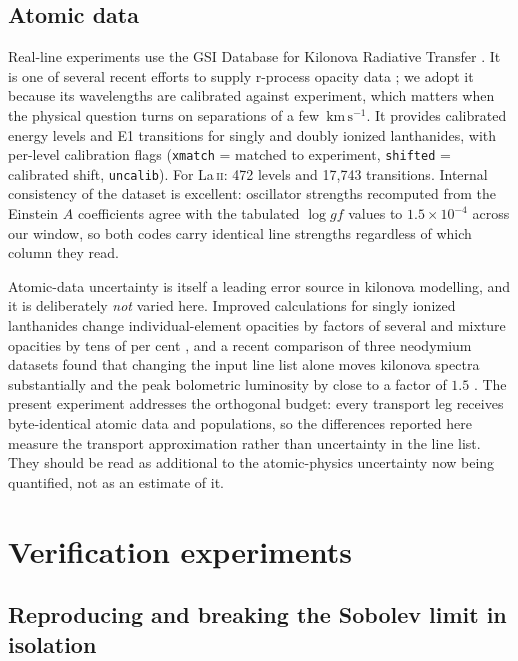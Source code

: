 \documentclass[fleqn,usenatbib]{mnras}
\newcommand{\kms}{\,\mathrm{km\,s^{-1}}}
\begin{document}
\subsection{Atomic data}
\label{sec:data}

Real-line experiments use the GSI Database for Kilonova Radiative Transfer
\citep{gsi_atomic,gsi_zenodo}. It is one of several recent efforts to supply
r-process opacity data \citep[cf.][]{tanaka2020,kato2024}; we adopt it
because its wavelengths are calibrated against experiment, which matters when
the physical question turns on separations of a few $\kms$. It provides
calibrated energy levels and E1 transitions
for singly and doubly ionized lanthanides, with per-level calibration flags
(\texttt{xmatch} = matched to experiment, \texttt{shifted} = calibrated
shift, \texttt{uncalib}). For La\,\textsc{ii}: 472 levels and 17{,}743
transitions. Internal consistency of the dataset is excellent: oscillator
strengths recomputed from the Einstein $A$ coefficients agree with the
tabulated $\log gf$ values to $1.5\times10^{-4}$ across our window, so both
codes carry identical line strengths regardless of which column they read.

Atomic-data uncertainty is itself a leading error source in kilonova
modelling, and it is deliberately \emph{not} varied here. Improved
calculations for singly ionized lanthanides change individual-element
opacities by factors of several and mixture opacities by tens of per cent
\citep{kato2024}, and a recent comparison of three neodymium datasets found
that changing the input line list alone moves kilonova spectra substantially
and the peak bolometric luminosity by close to a factor of $1.5$
\citep{fontes2026}. The present experiment addresses the orthogonal budget:
every transport leg receives byte-identical atomic data and populations, so
the differences reported here measure the transport approximation rather
than uncertainty in the line list. They should be read as additional to the
atomic-physics uncertainty now being quantified, not as an estimate of it.

\section{Verification experiments}
\label{sec:verification}

\subsection{Reproducing and breaking the Sobolev limit in isolation}
\end{document}
